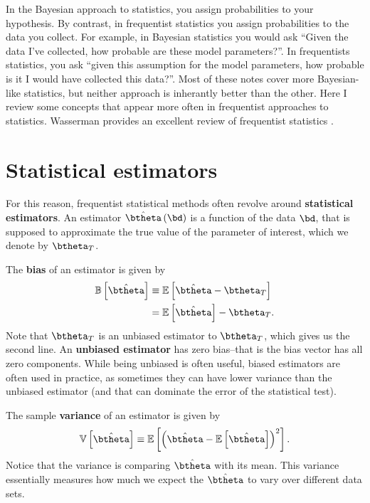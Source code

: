 In the Bayesian approach to statistics, you assign probabilities to your hypothesis.
By contrast, in frequentist statistics you assign probabilities to the data you collect.
For example, in Bayesian statistics you would ask ``Given the data I've collected, how probable are these model parameters?''.
In frequentists statistics, you ask ``given this assumption for the model parameters, how probable is it I would have collected this data?''.
Most of these notes cover more Bayesian-like statistics, but neither approach is inherantly better than the other.
Here I review some concepts that appear more often in frequentist approaches to statistics.
Wasserman provides an excellent review of frequentist statistics \cite{wasserman2010statistics}.

\section{Statistical estimators}


For this reason, frequentist statistical methods often revolve around \textbf{statistical estimators}.
An estimator $\hat{\btheta}\left(\bd\right)$ is a function of the data $\bd$, that is supposed to approximate the true value of the parameter of interest, which we denote by $\btheta_T$.

The \textbf{bias} of an estimator is given by
\begin{align}
    \label{eq:estimator-bias-definition}
    \mathbb{B}\left[\hat{\btheta}\right]
    &\equiv
    \mathbb{E}\left[\hat{\btheta} - \btheta_T\right]
    \nonumber\\
    &=
    \mathbb{E}\left[\hat{\btheta}\right] - \btheta_T
    .
\end{align}
Note that $\btheta_T$ is an unbiased estimator to $\btheta_T$, which gives us the second line.
An \textbf{unbiased estimator} has zero bias--that is the bias vector has all zero components.
While being unbiased is often useful, biased estimators are often used in practice, as sometimes they can have lower variance than the unbiased estimator (and that can dominate the error of the statistical test).

The sample \textbf{variance} of an estimator is given by
\begin{align}
    \label{eq:estimator-variance-definition}
    \mathbb{V}\left[\hat{\btheta}\right]
    \equiv
    \mathbb{E}\left[\left(\hat{\btheta} - \mathbb{E}\left[\hat{\btheta}\right]\right)^2\right]
    .
\end{align}
Notice that the variance is comparing $\hat{\btheta}$ with its mean. 
This variance essentially measures how much we expect the $\hat{\btheta}$ to vary over different data sets.

